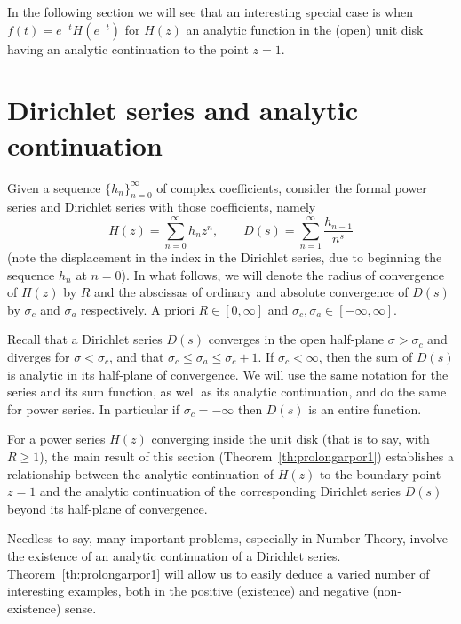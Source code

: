 \documentclass[11pt,a4paper]{amsart}
\theoremstyle{plain}
\theoremstyle{plain}
\theoremstyle{plain}
\theoremstyle{definition}
\theoremstyle{remark}
\begin{document}
In the following section we will see that an interesting special case is when $f(t) = e^{-t} H(e^{-t})$ for $H(z)$ an analytic function in the (open) unit disk having an analytic continuation to the point $z=1$.


\section{Dirichlet series and analytic continuation}
\label{sec:dirichlet}

Given a sequence $\{h_{n}\}_{n=0}^{\infty}$ of complex coefficients, consider the 
formal power series and Dirichlet series with those coefficients, namely
\begin{equation*}
  H(z) = \sum_{n=0}^{\infty} h_{n} z^{n},
  \qquad
  D(s) = \sum_{n=1}^{\infty} \frac{h_{n-1}}{n^{s}}
\end{equation*}
(note the displacement in the index in the Dirichlet series, due to beginning the sequence $h_{n}$ at $n=0$). In what follows, we will denote the radius of convergence of $H(z)$ by $R$ and the abscissas of ordinary and absolute convergence of $D(s)$ by $\sigma_{c}$ and $\sigma_{a}$ respectively. A priori $R \in [0,\infty]$ and $\sigma_{c},\sigma_{a} \in [-\infty,\infty]$.


Recall that a Dirichlet series $D(s)$ converges in the open half-plane $\sigma > \sigma_{c}$ and diverges for $\sigma < \sigma_{c}$, and that $\sigma_{c} \leq \sigma_{a} \leq \sigma_{c} + 1$. If $\sigma_{c} < \infty$, then the sum of $D(s)$ is analytic in its half-plane of convergence. We will use the same notation for the series and its sum function, as well as its analytic continuation, and do the same for power series. In particular if $\sigma_{c} = -\infty$ then $D(s)$ is an entire function.


For a power series $H(z)$ converging inside the unit disk (that is to say, with $R \geq 1$), the main result of this section (Theorem~\ref{th:prolongarpor1}) establishes a relationship between the analytic continuation of $H(z)$ to the boundary point $z=1$ and the analytic continuation of the corresponding Dirichlet series $D(s)$ beyond its half-plane of convergence.

Needless to say, many important problems, especially in Number Theory, involve the existence of an analytic continuation of a Dirichlet series. Theorem~\ref{th:prolongarpor1} will allow us to easily deduce a varied number of interesting examples, both in the positive (existence) and negative (non-existence) sense.
\end{document}
